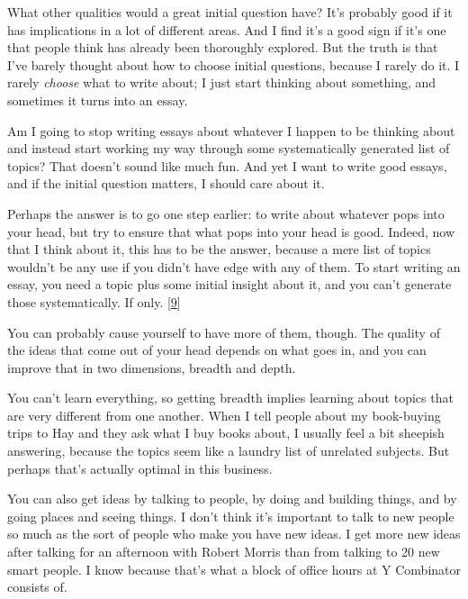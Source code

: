 What other qualities would a great
                  initial question have? It's probably good if it has
                  implications in a lot of different areas. And I find it's a
                  good sign if it's one that people think has already been
                  thoroughly explored. But the truth is that I've barely thought
                  about how to choose initial questions, because I rarely do it.
                  I rarely \emph{choose} what to write about; I just start
                  thinking about something, and sometimes it turns into an
                  essay.

Am I going to stop writing essays about
                  whatever I happen to be thinking about and instead start
                  working my way through some systematically generated list of
                  topics? That doesn't sound like much fun. And yet I want to
                  write good essays, and if the initial question matters, I
                  should care about it.

Perhaps the answer is to go
                  one step earlier: to write about whatever pops into your head,
                  but try to ensure that what pops into your head is good.
                  Indeed, now that I think about it, this has to be the answer,
                  because a mere list of topics wouldn't be any use if you
                  didn't have edge with any of them. To start writing an essay,
                  you need a topic plus some initial insight about it, and you
                  can't generate those systematically. If only.
                  [\href{\#f9n}{9}]

You can probably cause yourself to have more of
                  them, though. The quality of the ideas that come out of your
                  head depends on what goes in, and you can improve that in two
                  dimensions, breadth and depth.

You can't learn
                  everything, so getting breadth implies learning about topics
                  that are very different from one another. When I tell people
                  about my book-buying trips to Hay and they ask what I buy
                  books about, I usually feel a bit sheepish answering, because
                  the topics seem like a laundry list of unrelated subjects. But
                  perhaps that's actually optimal in this business.

You
                  can also get ideas by talking to people, by doing and building
                  things, and by going places and seeing things. I don't think
                  it's important to talk to new people so much as the sort of
                  people who make you have new ideas. I get more new ideas after
                  talking for an afternoon with Robert Morris than from talking
                  to 20 new smart people. I know because that's what a block of
                  office hours at Y Combinator consists of.

